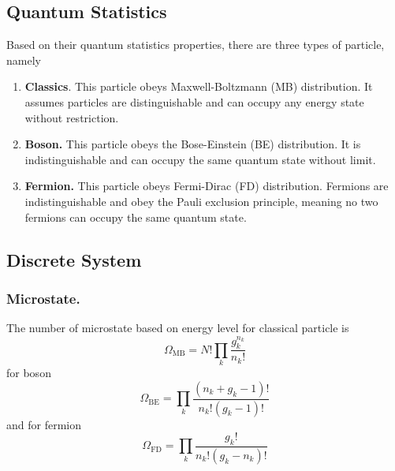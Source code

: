 \documentclass[../../../Main.tex]{subfiles}
\begin{document}
\subsection*{Quantum Statistics}
Based on their quantum statistics properties, there are three types of particle, namely 
\begin{enumerate}
    \item \textbf{Classics}. This particle obeys Maxwell-Boltzmann (MB) distribution. It assumes particles are distinguishable and can occupy any energy state without restriction.
    \item \textbf{Boson.} This particle obeys the Bose-Einstein (BE) distribution. It is indistinguishable and can occupy the same quantum state without limit.
    \item \textbf{Fermion.} This particle obeys Fermi-Dirac (FD) distribution. Fermions are indistinguishable and obey the Pauli exclusion principle, meaning no two fermions can occupy the same quantum state.
\end{enumerate}

\subsection*{Discrete System}
\subsubsection*{Microstate.} The number of microstate based on energy level for classical particle is 
\begin{equation*}
    \Omega_\text{MB}=N!\prod_k \frac{g_k^{n_k}}{n_k!}
\end{equation*}
for boson 
\begin{equation*}
    \Omega_\text{BE}=\prod_k\frac{(n_k+g_k-1)!}{n_k!(g_k-1)!}
\end{equation*}
and for fermion
\begin{equation*}
    \Omega_\text{FD}=\prod_k\frac{g_k!}{n_k!(g_k-n_k)!}
\end{equation*}
\end{document}

